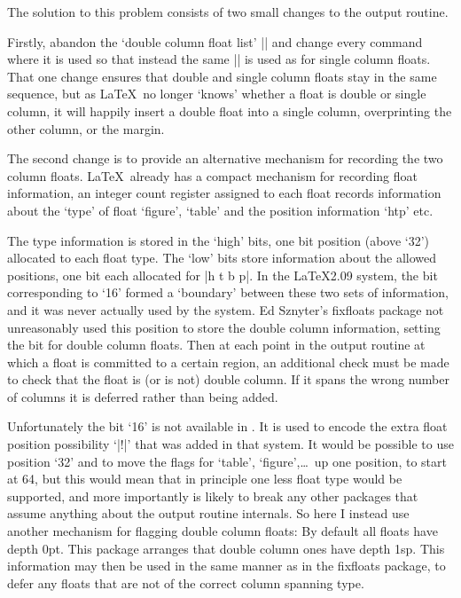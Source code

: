 \documentclass{ltxguide}
\newcommand\Lpack[1]{\mbox{\textsf{#1}}}
\begin{document}
The solution to this problem consists of two small changes to
the output routine.

Firstly, abandon the `double column float list' |\@dbldeferlist|
and change every command where it is used so that instead the
same |\@deferlist| is used as for single column floats.
That one change ensures that double and single column floats
stay in the same sequence, but as \LaTeX\ no longer `knows'
whether a float is double or single column, it will happily
insert a double float into a single column, overprinting the
other column, or the margin.

The second change is to provide an alternative mechanism for
recording the two column floats. \LaTeX\ already has a compact
mechanism for recording float information, an integer count register
assigned to each float records information about the `type' of float
`figure', `table' and the position information `htp' etc.

The type information is stored in the `high' bits, one bit position
(above `32') allocated to each float type. The `low' bits store
information about the allowed positions, one bit each allocated for
|h t b p|.  In the \LaTeX2.09 system, the bit corresponding to `16'
formed a `boundary' between these two sets of information, and it
was never actually used by the system. Ed Sznyter's
\Lpack{fixfloats} package not unreasonably used this position to
store the double column information, setting the bit for double
column floats. Then at each point in the output routine at which a
float is committed to a certain region, an additional check must be
made to check that the float is (or is not) double column. If it
spans the wrong number of columns it is deferred rather than being
added.

Unfortunately the bit `16' is not available in \LaTeXe. It is used
to encode the extra float position possibility `|!|' that was added
in that system. It would be possible to use position `32' and to
move the flags for `table', `figure',\ldots\ up one position, to
start at 64, but this would mean that in principle one less float
type would be supported, and more importantly is likely to break
any other packages that assume anything about the output routine
internals. So here I instead use another mechanism for flagging
double column floats: By default all floats have depth 0pt.
This package arranges that double column ones have depth 1sp.
This information may then be used in the same manner as in
the \Lpack{fixfloats} package, to defer any floats that are not of
the correct column spanning type.
\end{document}

